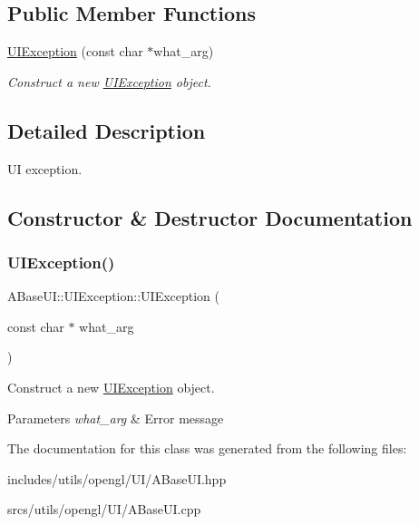 \subsection*{Public Member Functions}
\begin{DoxyCompactItemize}
\item 
\hyperlink{class_a_base_u_i_1_1_u_i_exception_af8a5466f6794a64d5644e00d228bb696}{U\+I\+Exception} (const char $\ast$what\+\_\+arg)
\begin{DoxyCompactList}\small\item\em Construct a new \hyperlink{class_a_base_u_i_1_1_u_i_exception}{U\+I\+Exception} object. \end{DoxyCompactList}\end{DoxyCompactItemize}


\subsection{Detailed Description}
UI exception. 

\subsection{Constructor \& Destructor Documentation}
\mbox{\label{class_a_base_u_i_1_1_u_i_exception_af8a5466f6794a64d5644e00d228bb696}} 
\subsubsection{\texorpdfstring{U\+I\+Exception()}{UIException()}}
{\footnotesize\ttfamily A\+Base\+U\+I\+::\+U\+I\+Exception\+::\+U\+I\+Exception (\begin{DoxyParamCaption}\item[{const char $\ast$}]{what\+\_\+arg }\end{DoxyParamCaption})\hspace{0.3cm}{\ttfamily [explicit]}}



Construct a new \hyperlink{class_a_base_u_i_1_1_u_i_exception}{U\+I\+Exception} object. 


\begin{DoxyParams}{Parameters}
{\em what\+\_\+arg} & Error message \\
\hline
\end{DoxyParams}


The documentation for this class was generated from the following files\+:\begin{DoxyCompactItemize}
\item 
includes/utils/opengl/\+U\+I/A\+Base\+U\+I.\+hpp\item 
srcs/utils/opengl/\+U\+I/A\+Base\+U\+I.\+cpp\end{DoxyCompactItemize}
